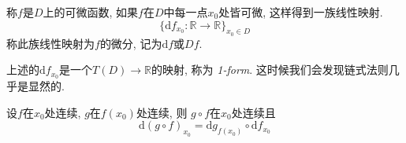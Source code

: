 \begin{definition}[整体微分]
    称$f$是$D$上的可微函数, 如果$f$在$D$中每一点$x_0$处皆可微, 这样得到一族线性映射.
    \begin{equation}
      \{ \mathrm{d} f_{x_0} \colon \mathbb{R}\to \mathbb{R} \}_{x_0 \in D}
    \end{equation}
    称此族线性映射为$f$的微分, 记为$\mathrm{d} f$或$Df$.
\end{definition}
上述的$\mathrm{d} f_{x_0}$是一个$T(D) \to \mathbb{R}$的映射, 称为 \emph{1-form}. 这时候我们会发现链式法则几乎是显然的.

\begin{theorem}[微分保持映射符合关系]
    设$f$在$x_0$处连续, $g$在$f\left( x_0 \right) $处连续, 则
    $g\circ f$在$x_0$处连续且
    \begin{equation}
      \mathrm{d}  \left( g \circ f \right) _{x_0} = \mathrm{d} g _{f\left( x_0 \right) } \circ \mathrm{d} f_{x_0}
    \end{equation}
\end{theorem}


